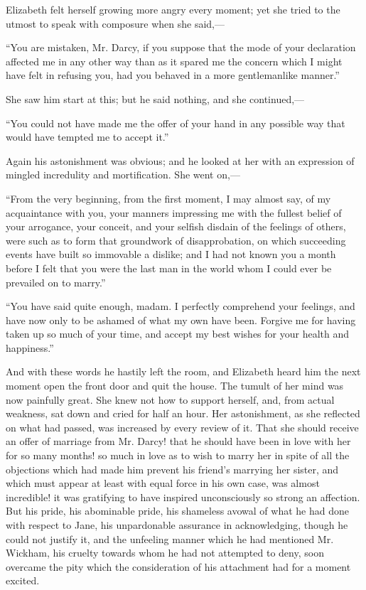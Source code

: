 \documentclass[12pt]{book}
\begin{document}
Elizabeth felt herself growing more angry every moment; yet she tried to the utmost to speak with composure when she said,---

``You are mistaken, Mr. Darcy, if you suppose that the mode of your declaration affected me in any other way than as it spared me the concern which I might have felt in refusing you, had you behaved in a more gentlemanlike manner.''

She saw him start at this; but he said nothing, and she continued,---

``You could not have made me the offer of your hand in any possible way that would have tempted me to accept it.''

Again his astonishment was obvious; and he looked at her with an expression of mingled incredulity and mortification. She went on,---

``From the very beginning, from the first moment, I may almost say, of my acquaintance with you, your manners impressing me with the fullest belief of your arrogance, your conceit, and your selfish disdain of the feelings of others, were such as to form that groundwork of disapprobation, on which succeeding events have built so immovable a dislike; and I had not known you a month before I felt that you were the last man in the world whom I could ever be prevailed on to marry.''

``You have said quite enough, madam. I perfectly comprehend your feelings, and have now only to be ashamed of what my own have been. Forgive me for having taken up so much of your time, and accept my best wishes for your health and happiness.''

And with these words he hastily left the room, and Elizabeth heard him the next moment open the front door and quit the house. The tumult of her mind was now painfully great. She knew not how to support herself, and, from actual weakness, sat down and cried for half an hour. Her astonishment, as she reflected on what had passed, was increased by every review of it. That she should receive an offer of marriage from Mr. Darcy! that he should have been in love with her for so many months! so much in love as to wish to marry her in spite of all the objections which had made him prevent his friend's marrying her sister, and which must appear at least with equal force in his own case, was almost incredible! it was gratifying to have inspired unconsciously so strong an affection. But his pride, his abominable pride, his shameless avowal of what he had done with respect to Jane, his unpardonable assurance in acknowledging, though he could not justify it, and the unfeeling manner which he had mentioned Mr. Wickham, his cruelty towards whom he had not attempted to deny, soon overcame the pity which the consideration of his attachment had for a moment excited.
\end{document}
